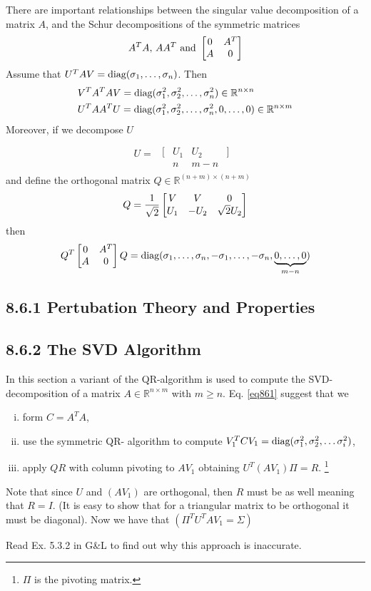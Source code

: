 There are important relationships between the singular value decomposition of a matrix
$A$, and the Schur decompositions of the symmetric matrices 
\begin{equation}
	A^TA,\, AA^T \text{ and } \left[\begin{matrix} 0 & A^T \\ A & 0 \end{matrix}\right]
\end{equation}
Assume that $U^TAV=\text{diag}{(}\sigma_1,\dots,\sigma_n)$. Then
\begin{align}
	&V^TA^TAV = \text{diag}{(}\sigma_1^2,\sigma_2^2,\dots,\sigma_n^2)\in\mathbb R^{n\times n}
	\label{eq861}\\
	&U^TAA^TU = \text{diag}{(}\sigma_1^2,\sigma_2^2,\dots,\sigma_n^2,0,\dots,0)\in\mathbb R^{n\times m}
\end{align}
Moreover, if we decompose $U$
\begin{align}
	U= 
\begin{matrix}
	\\
	\begin{matrix}
	[ & U_1 & U_2 & ]\\
	  &	n & m-n &
	\end{matrix}
\end{matrix}
\end{align}
and define the orthogonal matrix $Q\in\mathbb R^{(n+m)\times(n+m)}$
\begin{align}
	Q=\frac1{\sqrt 2}\left[\begin{matrix} V & V & 0 \\ U_1 & -U_2 & \sqrt2U_2 \end{matrix}\right]
\end{align}
then
\begin{align}
	Q^T\left[\begin{matrix} 0 & A^T \\ A & 0  \end{matrix}\right] Q 
	= \text{diag}{(}\sigma_1,\dots,\sigma_n,-\sigma_1,\dots,-\sigma_n,\underbrace{0,\dots,0}_{m-n})
\end{align}

\subsection*{8.6.1 Pertubation Theory and Properties}
\subsection*{8.6.2 The SVD Algorithm}
In this section a variant of the QR-algorithm is used to compute the SVD-decomposition of 
a matrix $A\in\mathbb R^{n\times m}$ with $m\ge n$.
Eq. \eqref{eq861} suggest that we
\begin{enumerate}[(i):]
	\item form $C=A^TA$,
	\item use the symmetric QR- algorithm to compute 
	$V_1^TCV_1 = \text{diag}{(}\sigma_1^2,\sigma_2^2,\dots\sigma_i^2)$,
	\item apply $QR$ with column pivoting to $AV_1$ obtaining $U^T(AV_1)\Pi=R$.
\footnote{$\Pi$ is the pivoting matrix.}
\end{enumerate}
Note that since $U$ and $(AV_1)$ are orthogonal, then $R$ must be as well meaning that $R=I$.
(It is easy to show that for a triangular matrix to be orthogonal it must be diagonal).
Now we have that $(\Pi^TU^T A V_1 = \Sigma)$

Read Ex. 5.3.2 in G\&L to find out why this approach is inaccurate.
